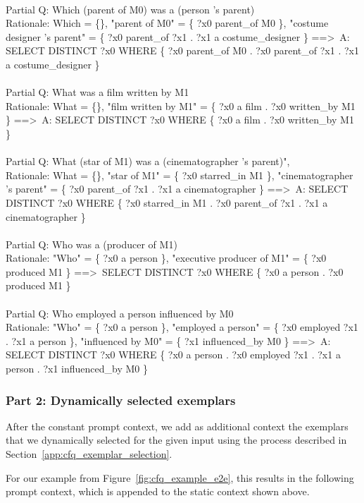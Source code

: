 \documentclass{article} \usepackage{iclr2022_conference,times}
\begin{document}
{ \\
Partial Q: Which (parent of M0) was a (person 's parent) \\
Rationale: Which = \{\}, "parent of M0" = \{ ?x0 parent\_of M0 \}, "costume designer 's parent" = \{ ?x0 parent\_of ?x1 . ?x1 a costume\_designer \} ==\textgreater \  A: SELECT DISTINCT ?x0 WHERE \{ ?x0 parent\_of M0 . ?x0 parent\_of ?x1 . ?x1 a costume\_designer \} \\
 \\
Partial Q: What was a film written by M1 \\
Rationale: What = \{\}, "film written by M1" = \{ ?x0 a film . ?x0 written\_by M1 \} ==\textgreater \  A: SELECT DISTINCT ?x0 WHERE \{ ?x0 a film . ?x0 written\_by M1 \} \\
 \\
Partial Q: What (star of M1) was a (cinematographer 's parent)", \\
Rationale: What = \{\}, "star of M1" = \{ ?x0 starred\_in M1 \}, "cinematographer 's parent" = \{ ?x0 parent\_of ?x1 . ?x1 a cinematographer \} ==\textgreater \  A: SELECT DISTINCT ?x0 WHERE \{ ?x0 starred\_in M1 . ?x0 parent\_of ?x1 . ?x1 a cinematographer \} \\
 \\
Partial Q: Who was a (producer of M1) \\
Rationale: "Who" = \{ ?x0 a person \}, "executive producer of M1" = \{ ?x0 produced M1 \} ==\textgreater \  SELECT DISTINCT ?x0 WHERE \{ ?x0 a person . ?x0 produced M1 \} \\
 \\
Partial Q: Who employed a person influenced by M0 \\
Rationale: "Who" = \{ ?x0 a person \}, "employed a person" = \{ ?x0 employed ?x1 . ?x1 a person \}, "influenced by M0" = \{ ?x1 influenced\_by M0 \} ==\textgreater \  A: SELECT DISTINCT ?x0 WHERE \{ ?x0 a person . ?x0 employed ?x1 . ?x1 a person . ?x1 influenced\_by M0 \}
}

\subsubsection{Part 2: Dynamically selected exemplars}
After the constant prompt context, we add as additional context the exemplars that we dynamically selected for the given input using the process described in Section~\ref{app:cfq_exemplar_selection}.

For our example from Figure~\ref{fig:cfq_example_e2e}, this results in the following prompt context, which is appended to the static context shown above.
\end{document}
